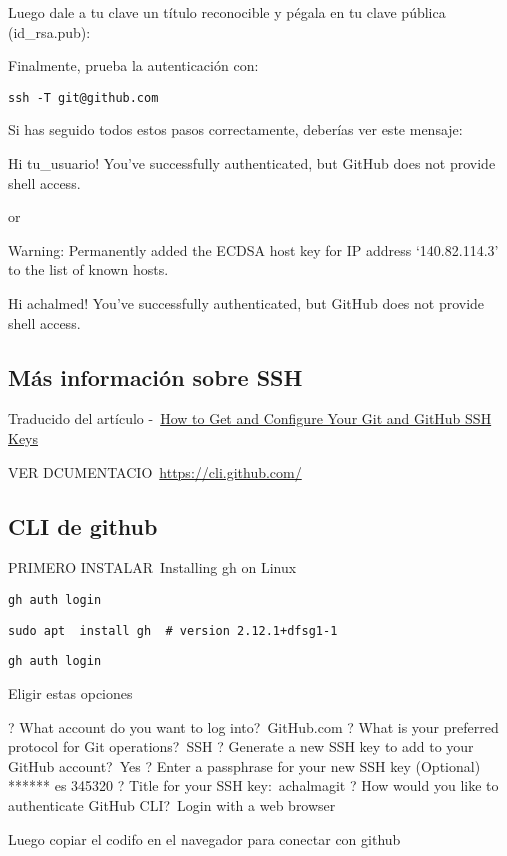 \documentclass[
  a2paper,
]{article}
\begin{document}
Luego dale a tu clave un título reconocible y pégala en tu clave pública
(id\_rsa.pub):

Finalmente, prueba la autenticación con:

\texttt{ssh\ -T~git@github.com}

Si has seguido todos estos pasos correctamente, deberías ver este
mensaje:

Hi tu\_usuario! You've successfully authenticated, but GitHub does not
provide shell access.~~

or

Warning: Permanently added the ECDSA host key for IP address
`140.82.114.3' to the list of known hosts.

Hi achalmed! You've successfully authenticated, but GitHub does not
provide shell access.

\hypertarget{muxe1s-informaciuxf3n-sobre-ssh}{%
\subsection{Más información sobre
SSH}\label{muxe1s-informaciuxf3n-sobre-ssh}}

Traducido del artículo
-~\href{https://www.freecodecamp.org/news/git-ssh-how-to/}{How to Get
and Configure Your Git and GitHub SSH Keys}

VER DCUMENTACIO~\url{https://cli.github.com/}~~

\hypertarget{cli-de-github}{%
\subsection{CLI de github}\label{cli-de-github}}

PRIMERO INSTALAR~Installing gh on Linux~~

\texttt{gh\ auth\ login}

\texttt{sudo\ apt~\ install\ gh~\ \#\ version\ 2.12.1+dfsg1-1}

\texttt{gh\ auth\ login}

Eligir estas opciones

? What account do you want to log into?~GitHub.com ? What is your
preferred protocol for Git operations?~SSH ? Generate a new SSH key to
add to your GitHub account?~Yes ? Enter a passphrase for your new SSH
key (Optional) ****** es 345320 ? Title for your SSH key:~achalmagit ?
How would you like to authenticate GitHub CLI?~Login with a web browser

Luego copiar el codifo en el navegador para conectar con github
\end{document}
